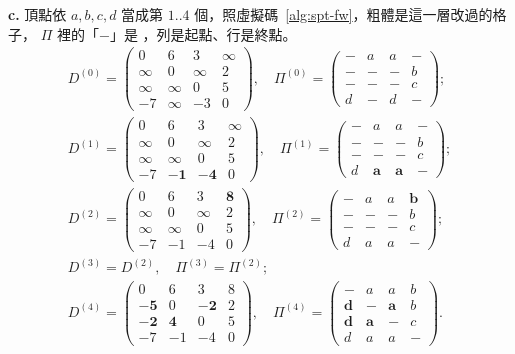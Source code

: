 \textbf{c.} 頂點依 $a, b, c, d$ 當成第 $1..4$ 個，照虛擬碼~\ref{alg:spt-fw}，粗體是這一層改過的格子，
$\Pi$ 裡的「$-$」是 \NIL，列是起點、行是終點。
\begin{gather*}
D^{(0)} = \begin{pmatrix} 0 & 6 & 3 & \infty \\ \infty & 0 & \infty & 2 \\ \infty & \infty & 0 & 5 \\ -7 & \infty & -3 & 0 \end{pmatrix},\quad
\Pi^{(0)} = \begin{pmatrix} - & a & a & - \\ - & - & - & b \\ - & - & - & c \\ d & - & d & - \end{pmatrix}; \\
D^{(1)} = \begin{pmatrix} 0 & 6 & 3 & \infty \\ \infty & 0 & \infty & 2 \\ \infty & \infty & 0 & 5 \\ -7 & \mathbf{-1} & \mathbf{-4} & 0 \end{pmatrix},\quad
\Pi^{(1)} = \begin{pmatrix} - & a & a & - \\ - & - & - & b \\ - & - & - & c \\ d & \mathbf{a} & \mathbf{a} & - \end{pmatrix}; \\
D^{(2)} = \begin{pmatrix} 0 & 6 & 3 & \mathbf{8} \\ \infty & 0 & \infty & 2 \\ \infty & \infty & 0 & 5 \\ -7 & -1 & -4 & 0 \end{pmatrix},\quad
\Pi^{(2)} = \begin{pmatrix} - & a & a & \mathbf{b} \\ - & - & - & b \\ - & - & - & c \\ d & a & a & - \end{pmatrix}; \\
D^{(3)} = D^{(2)},\quad \Pi^{(3)} = \Pi^{(2)}; \\
D^{(4)} = \begin{pmatrix} 0 & 6 & 3 & 8 \\ \mathbf{-5} & 0 & \mathbf{-2} & 2 \\ \mathbf{-2} & \mathbf{4} & 0 & 5 \\ -7 & -1 & -4 & 0 \end{pmatrix},\quad
\Pi^{(4)} = \begin{pmatrix} - & a & a & b \\ \mathbf{d} & - & \mathbf{a} & b \\ \mathbf{d} & \mathbf{a} & - & c \\ d & a & a & - \end{pmatrix}.
\end{gather*}
